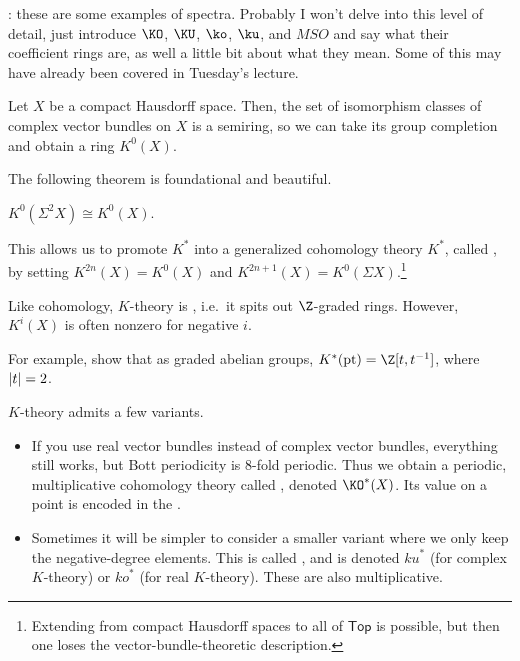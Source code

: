 \TODO: these are some examples of spectra. Probably I won't delve into this level of
detail, just introduce $\KO$, $\KU$, $\ko$, $\ku$, and $\mathit{MSO}$ and say what their coefficient rings are, as
well a little bit about what they mean. Some of this may have already been covered in Tuesday's lecture.
\begin{exm}[$K$-theory]
Let $X$ be a compact Hausdorff space. Then, the set of isomorphism classes of complex vector bundles on $X$ is a
semiring, so we can take its group completion and obtain a ring $K^0(X)$.

The following theorem is foundational and beautiful.
\begin{thm}
$K^0(\Sigma^2 X)\cong K^0(X)$.
\end{thm}
This allows us to promote $K^*$ into a  generalized cohomology theory $K^*$, called
, by setting $K^{2n}(X) = K^0(X)$ and $K^{2n+1}(X) = K^0(\Sigma X)$.\footnote{Extending
from compact Hausdorff spaces to all of $\mathsf{Top}$ is possible, but then one loses the vector-bundle-theoretic
description.}

Like cohomology, $K$-theory is , i.e.\ it spits out $\Z$-graded rings. However, $K^i(X)$ is
often nonzero for negative $i$.
\begin{ex}
For example, show that as graded abelian groups, $K^*(\pt) = \Z[t,t^{-1}]$, where $\lvert t\rvert = 2$.
\end{ex}

$K$-theory admits a few variants.
\begin{itemize}
	\item If you use real vector bundles instead of complex vector bundles, everything still works, but Bott
	periodicity is $8$-fold periodic. Thus we obtain a periodic, multiplicative cohomology theory called , denoted $\KO^*(X)$. Its value on a point is encoded in the .
	\item Sometimes it will be simpler to consider a smaller variant where we only keep the negative-degree
	elements. This is called , and is denoted $\mathit{ku}^*$ (for complex $K$-theory)
	or $\mathit{ko}^*$ (for real $K$-theory). These are also multiplicative. \qedhere
\end{itemize}
\end{exm}
